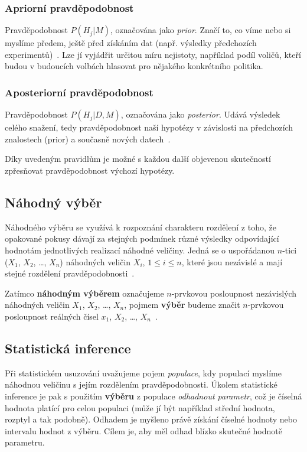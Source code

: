 \documentclass[thesis=M,czech]{FITthesis}[2014/05/07]
\begin{document}
\subsubsection{Apriorní pravděpodobnost}
Pravděpodobnost $P(H_j | M)$, označována jako \emph{prior}. Značí to, co víme nebo si myslíme předem, ještě před získáním dat (např. výsledky předchozích experimentů)~\cite{pst4}. Lze jí vyjádřit určitou míru nejistoty, například podíl voličů, kteří budou v budoucích volbách hlasovat pro nějakého konkrétního politika. 

\subsubsection{Aposteriorní pravděpodobnost}
Pravděpodobnost $P(H_j | D, M)$, označována jako \emph{posterior}. Udává výsledek celého snažení, tedy pravděpodobnost naší hypotézy v závislosti na předchozích znalostech (prior) a současně nových datech~\cite{pst4}.

Díky uvedeným pravidlům je možné s každou další objevenou skutečností zpřesňovat pravděpodobnost výchozí hypotézy. 

\subsection{Náhodný výběr}
Náhodného výběru se využívá k rozpoznání charakteru rozdělení z toho, že opakované pokusy dávají za stejných podmínek různé výsledky odpovídající hodnotám jednotlivých realizací náhodné veličiny. Jedná se o uspořádanou $n$-tici ($X_1$, $X_2$, \ldots, $X_n$) náhodných veličin $X_i$, $1 \leq i \leq n$, které jsou nezávislé a mají stejné rozdělení pravděpodobnosti~\cite{pst3}.

Zatímco \textbf{náhodným výběrem} označujeme $n$-prvkovou posloupnost nezávislých náhodných veličin $X_1$, $X_2$, \ldots, $X_n$, pojmem \textbf{výběr} budeme značit $n$-prvkovou posloupnost reálných čísel $x_1$, $X_2$, \ldots, $X_n$~\cite{pst5}. 

\subsection{Statistická inference}
Při statistickém usuzování uvažujeme pojem \emph{populace}, kdy populací myslíme náhodnou veličinu s jejím rozdělením pravděpodobnosti. Úkolem statistické inference je pak s použitím \textbf{výběru} z populace \emph{odhadnout parametr}, což je číselná hodnota platící pro celou populaci (může jí být například střední hodnota, rozptyl a tak podobně). Odhadem je myšleno právě získání číselné hodnoty nebo intervalu hodnot z výběru. Cílem je, aby měl odhad blízko skutečné hodnotě parametru.
\end{document}
